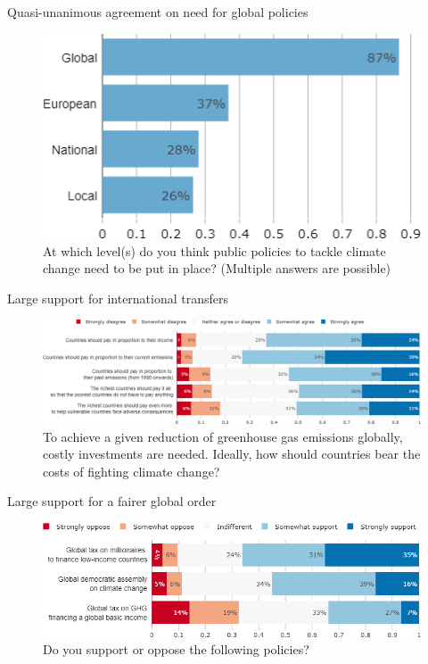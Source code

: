\begin{framefont}{\small}
\begin{frame}{Quasi-unanimous agreement on need for global policies}%
\vspace{-1cm}
\begin{figure}[h!]
\centering
\caption{\small{At which level(s) do you think public policies to tackle climate change need to be put in place? (Multiple answers are possible)}}
\includegraphics[width=.43\paperwidth]{../figures/FR/scale_FR.png}
\end{figure}
\end{frame}

\begin{frame}{Large support for international transfers}%
\begin{figure}[h!]
\centering
\caption{To achieve a given reduction of greenhouse gas emissions globally, costly investments are needed.
Ideally, how should countries bear the costs of fighting climate change?}
\vspace{2mm}
\includegraphics[width=.95\paperwidth]{../figures/FR/burden_sharing_FR.png}
\end{figure}
\end{frame}

\begin{frame}{Large support for a fairer global order}%
\begin{figure}[h!]
\centering
\caption{Do you support or oppose the following policies?}
\vspace{2mm}
\includegraphics[width=.87\paperwidth]{../figures/FR/global_policies_FR.png}
\end{figure}
\end{frame}


\end{framefont}
